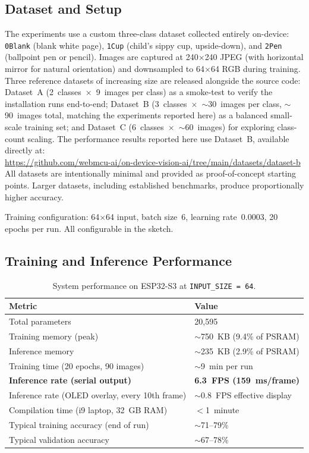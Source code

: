 \documentclass[12pt]{article}
\begin{document}
\subsection{Dataset and Setup}
\label{subsec:dataset}

The experiments use a custom three-class dataset collected entirely on-device:
\texttt{0Blank} (blank white page), \texttt{1Cup} (child's sippy cup,
upside-down), and \texttt{2Pen} (ballpoint pen or pencil).
Images are captured at 240$\times$240 JPEG (with horizontal mirror for natural
orientation) and downsampled to 64$\times$64 RGB during training.
Three reference datasets of increasing size are released alongside the source
code: Dataset~A (2~classes~$\times$~9~images per class) as a smoke-test to verify
the installation runs end-to-end; Dataset~B (3~classes~$\times$~$\sim$30~images
per class, $\sim$90~images total, matching the experiments reported here) as a
balanced small-scale training set; and Dataset~C (6~classes~$\times$~$\sim$60~images)
for exploring class-count scaling.
The performance results reported here use Dataset~B, available directly at:\\
\url{https://github.com/webmcu-ai/on-device-vision-ai/tree/main/datasets/dataset-b}\\
All datasets are intentionally minimal and provided as proof-of-concept starting
points.
Larger datasets, including established benchmarks, produce proportionally
higher accuracy.

Training configuration: 64$\times$64 input, batch size~6, learning rate~0.0003,
20 epochs per run.
All configurable in the sketch.

\subsection{Training and Inference Performance}
\label{subsec:perf}

\begin{table}[H]
\centering
\caption{System performance on ESP32-S3 at \texttt{INPUT\_SIZE = 64}.}
\label{tab:perf}
\begin{tabular}{ll}
\toprule
\textbf{Metric} & \textbf{Value} \\
\midrule
Total parameters & 20{,}595 \\
Training memory (peak) & $\sim$750~KB (9.4\% of PSRAM) \\
Inference memory & $\sim$235~KB (2.9\% of PSRAM) \\
Training time (20 epochs, 90 images) & $\sim$9~min per run \\
\textbf{Inference rate (serial output)} & \textbf{6.3~FPS (159~ms/frame)} \\
Inference rate (OLED overlay, every 10th frame) & $\sim$0.8~FPS effective display \\
Compilation time (i9 laptop, 32~GB RAM) & $<$1~minute \\
Typical training accuracy (end of run) & $\sim$71--79\% \\
Typical validation accuracy & $\sim$67--78\%  \\
\bottomrule
\end{tabular}
\end{table}
\end{document}
